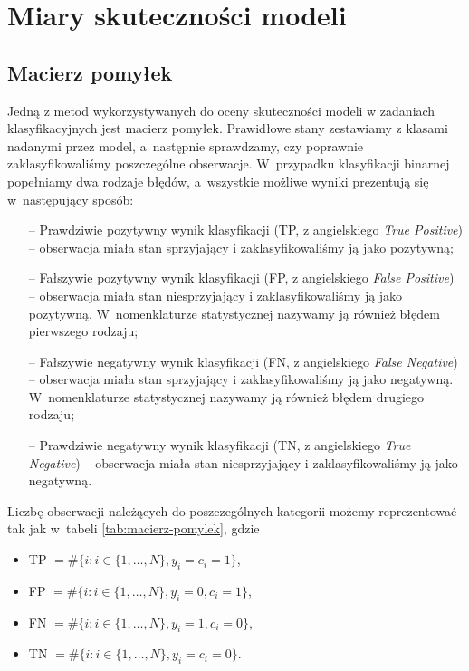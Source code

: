 \documentclass[inzynierska]{pwr_wmat_praca_dyplomowa}
\theoremstyle{plain}
\numberwithin{theorem}{chapter}
\theoremstyle{definition}
\numberwithin{theorem}{chapter}
\begin{document}
\section{Miary skuteczności modeli}

\subsection{Macierz pomyłek}

Jedną z metod wykorzystywanych do oceny skuteczności modeli w zadaniach klasyfikacyjnych jest macierz pomyłek. Prawidłowe stany zestawiamy z klasami nadanymi przez model, a~następnie sprawdzamy, czy poprawnie zaklasyfikowaliśmy poszczególne obserwacje. W~przypadku klasyfikacji binarnej popełniamy dwa rodzaje błędów, a~wszystkie możliwe wyniki prezentują się w~następujący sposób:
\begin{itemize}
	\item[--] Prawdziwie pozytywny wynik klasyfikacji (TP, z angielskiego \textit{True Positive}) -- obserwacja miała stan sprzyjający i zaklasyfikowaliśmy ją jako pozytywną;
	\item[--] Fałszywie pozytywny wynik klasyfikacji (FP, z angielskiego \textit{False Positive}) -- obserwacja miała stan niesprzyjający i zaklasyfikowaliśmy ją jako pozytywną. W~nomenklaturze statystycznej nazywamy ją również błędem pierwszego rodzaju;
	\item[--] Fałszywie negatywny wynik klasyfikacji (FN, z angielskiego \textit{False Negative}) -- obserwacja miała stan sprzyjający i zaklasyfikowaliśmy ją jako negatywną. W~nomenklaturze statystycznej nazywamy ją również błędem drugiego rodzaju;
	\item[--] Prawdziwie negatywny wynik klasyfikacji (TN, z angielskiego \textit{True Negative}) -- obserwacja miała stan niesprzyjający i zaklasyfikowaliśmy ją jako negatywną.
\end{itemize}
\noindent Liczbę obserwacji należących do poszczególnych kategorii możemy reprezentować tak jak w~tabeli \ref{tab:macierz-pomylek}, gdzie
\begin{itemize}
	\item TP $ = \#\{i: i \in \{1,\dots,N\}, y_i = c_i = 1\}$,
	\item FP $ = \#\{i: i \in \{1,\dots,N\}, y_i = 0, c_i = 1\}$,
	\item FN $ = \#\{i: i \in \{1,\dots,N\}, y_i = 1, c_i = 0\}$,
	\item TN $ = \#\{i: i \in \{1,\dots,N\}, y_i = c_i = 0\}$.
\end{itemize}
\end{document}
